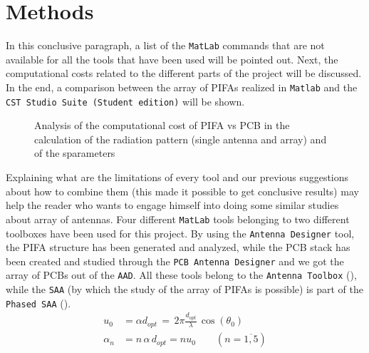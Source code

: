\documentclass[10 pt,a4paper,twocolumn]{article}
\begin{document}
{\section*{Methods}
In this conclusive paragraph, a list of the \texttt{\color{BurntOrange}MatLab} commands that are not available for all the tools that have been used will be pointed out. Next, the computational costs related to the different parts of the project will be discussed. In the end, a comparison between the array of PIFAs realized in \texttt{\color{BurntOrange}Matlab} and the \texttt{\color{Periwinkle}CST Studio Suite (Student edition)} will be shown. 
\begin{figure}[b!]
	\centering
		\def\svgwidth{0.9\linewidth}
		\tiny{}
		\caption{Analysis of the computational cost of PIFA vs PCB in the calculation of the radiation pattern (single antenna and array) and of the sparameters}
	\end{figure}
\begin{figure}[b!]
	\centering
	\def\svgwidth{0.9\linewidth}
	\tiny{}
	\caption{}
\end{figure}
\indent Explaining what are the limitations of every tool and our previous suggestions about how to combine them (this made it possible to get conclusive results) may help the reader who wants to engage himself into doing some similar studies about array of antennas. Four different \texttt{\color{BurntOrange}MatLab} tools belonging to two different toolboxes have been used for this project. By using the \texttt{\color{Mahogany}Antenna Designer} tool, the PIFA structure has been generated and analyzed, while the PCB stack has been created and studied through the \texttt{\color{Mahogany}PCB Antenna Designer} and we got the array of PCBs out of the \texttt{\color{Mahogany}AAD}. All these tools belong to the \texttt{\color{ForestGreen}Antenna Toolbox} (\textbf{\cite{AntennaToolbox}}), while the \texttt{\color{Mahogany}SAA} (by which the study of the array of PIFAs is possible) is part of the \texttt{\color{ForestGreen}Phased SAA} (\textbf{\cite{PhasedArraySystemToolbox}}). 
\begin{equation}
	\begin{aligned}
		u_0&=\alpha d_{opt}\,=\,2\pi\frac{d_{opt}}{\lambda}\,\cos(\theta_0)\\
		\alpha_n&=n\,\alpha\,d_{opt}=nu_0\qquad \left(n=\overline{1,5}\right)
		\label{eq:phase coefficients}
	\end{aligned}
\end{equation}

}
\end{document}
